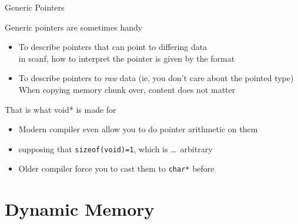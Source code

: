 \begin{frame}{Generic Pointers}
  \begin{block}{Generic pointers are sometimes handy}
    \begin{itemize}
    \item To describe pointers that can point to differing data\\
       in scanf, how to interpret the pointer is given by
      the format
    \item To describe pointers to \textit{raw} data (ie, you don't care about
      the pointed type)\\
       When copying memory chunk over, content does not matter
    \end{itemize}
  \end{block}
  \begin{block}{That is what void* is made for}
    \begin{itemize}
    \item Modern compiler even allow you to do pointer arithmetic on them
    \item[] supposing that \texttt{sizeof(void)=1}, which is \ldots\ arbitrary
    \item Older compiler force you to cast them to \texttt{char*} before
    \end{itemize}
  \end{block}
\end{frame}
\section{Dynamic Memory}\subtoc
